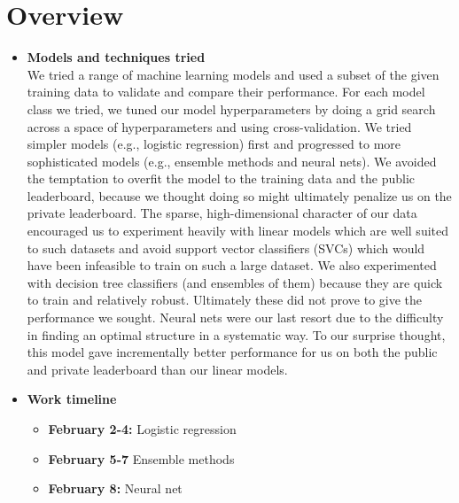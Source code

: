 \section{Overview}
\medskip
\begin{itemize}
  
\item \textbf{Models and techniques tried}\\
  
  We tried a range of machine learning models and used a subset of the given training data to validate and compare their performance. For each model class we tried, we tuned our model hyperparameters by doing a grid search across a space of hyperparameters and using cross-validation. We tried simpler models (e.g., logistic regression) first and progressed to more sophisticated models (e.g., ensemble methods and neural nets). We avoided the temptation to overfit the model to the training data and the public leaderboard, because we thought doing so might ultimately penalize us on the private leaderboard. The sparse, high-dimensional character of our data encouraged us to experiment heavily with linear models which are well suited to such datasets and avoid support vector classifiers (SVCs) which would have been infeasible to train on such a large dataset. We also experimented with decision tree classifiers (and ensembles of them) because they are quick to train and relatively robust. Ultimately these did not prove to give the performance we sought. Neural nets were our last resort due to the difficulty in finding an optimal structure in a systematic way. To our surprise thought, this model gave incrementally better performance for us on both the public and private leaderboard than our linear models. 
  
\item \textbf{Work timeline}
  \begin{itemize}
  \item \textbf{February 2-4:} Logistic regression
  \item \textbf{February 5-7} Ensemble methods 
  \item \textbf{February 8:} Neural net
  \end{itemize}
  
\end{itemize}


